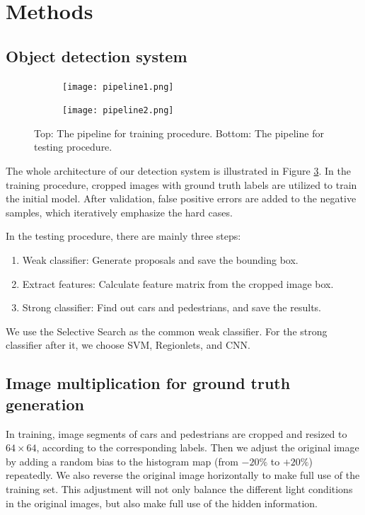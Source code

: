 \documentclass{article} %
\begin{document}
\section{Methods}

\subsection{Object detection system}


\begin{figure}[htb]
\begin{subfigure}[b]{0.9\textwidth}
    \centering
    \texttt{[image: pipeline1.png]}
    \label{fig:pipeline1}
\end{subfigure}
\begin{subfigure}[b]{0.9\textwidth}
    \centering
    \texttt{[image: pipeline2.png]}
    \label{fig:pipeline2}
\end{subfigure}
\caption{Top: The pipeline for training procedure. Bottom: The pipeline for testing procedure.
\label{fig:pipeline}}
\end{figure}


The whole architecture of our detection system is illustrated in Figure \ref{fig:pipeline}. In the training procedure, cropped images with ground truth labels are utilized to train the initial model. After validation, false positive errors are added to the negative samples, which iteratively emphasize the hard cases. 

In the testing procedure, there are mainly three steps: 
\begin{enumerate}[Step 1]
    \item Weak classifier: Generate proposals and save the bounding box.
    \item Extract features: Calculate feature matrix from the cropped image box.
    \item Strong classifier: Find out cars and pedestrians, and save the results.
\end{enumerate}

We use the Selective Search \cite{van2011segmentation} as the common weak classifier. For the strong classifier after it, we choose SVM, Regionlets, and CNN.

\subsection{Image multiplication for ground truth generation}
\label{sec:positive}

In training, image segments of cars and pedestrians are cropped and resized to $64 \times 64$, according to the corresponding labels. Then we adjust the original image by adding a random bias to the histogram map (from $-20\%$ to $+20\%$) repeatedly. We also reverse the original image horizontally to make full use of the training set. This adjustment will not only balance the different light conditions in the original images, but also make full use of the hidden information. 
\end{document}
